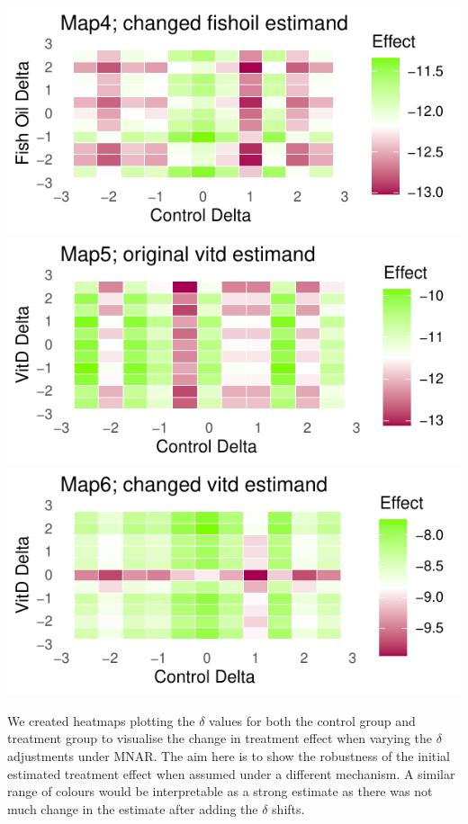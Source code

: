 \documentclass{article}
\newcommand{\pandocbounded}[1]{#1}
\begin{document}
\pandocbounded{\includegraphics[keepaspectratio]{Final_Report_files/figure-latex/unnamed-chunk-41-4.pdf}}
\pandocbounded{\includegraphics[keepaspectratio]{Final_Report_files/figure-latex/unnamed-chunk-41-5.pdf}}
\pandocbounded{\includegraphics[keepaspectratio]{Final_Report_files/figure-latex/unnamed-chunk-41-6.pdf}}

We created heatmaps plotting the \(\delta\) values for both the control
group and treatment group to visualise the change in treatment effect
when varying the \(\delta\) adjustments under MNAR. The aim here is to
show the robustness of the initial estimated treatment effect when
assumed under a different mechanism. A similar range of colours would be
interpretable as a strong estimate as there was not much change in the
estimate after adding the \(\delta\) shifts.
\end{document}
